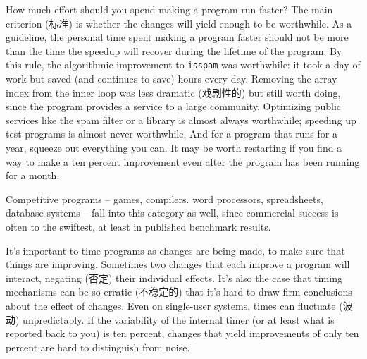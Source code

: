 How much effort should you spend making a program run faster? The main
criterion (标准) is whether the changes will yield enough to be worthwhile.
As a guideline, the personal time spent making a program faster should not
be more than the time the speedup will recover during the lifetime of the
program. By this rule, the algorithmic improvement to \verb'isspam' was
worthwhile: it took a day of work but saved (and continues to save) hours
every day. Removing the array index from the inner loop was less dramatic
(戏剧性的) but still worth doing, since the program provides a service to a
large community. Optimizing public services like the spam filter or a
library is almost always worthwhile; speeding up test programs is almost
never worthwhile. And for a program that runs for a year, squeeze out
everything you can. It may be worth restarting if you find a way to make a
ten percent improvement even after the program has been running for a
month.

Competitive programs -- games, compilers. word processors, spreadsheets,
database systems -- fall into this category as well, since commercial
success is often to the swiftest, at least in published benchmark results.

It's important to time programs as changes are being made, to make sure
that things are improving. Sometimes two changes that each improve a
program will interact, negating (否定) their individual effects. It's also
the case that timing mechanisms can be so erratic (不稳定的) that it's hard
to draw firm conclusions about the effect of changes.  Even on single-user
systems,  times can fluctuate (波动) unpredictably. If the variability of
the internal timer (or at least what is reported back to you) is ten
percent, changes that yield improvements of only ten percent are hard to
distinguish from noise.
